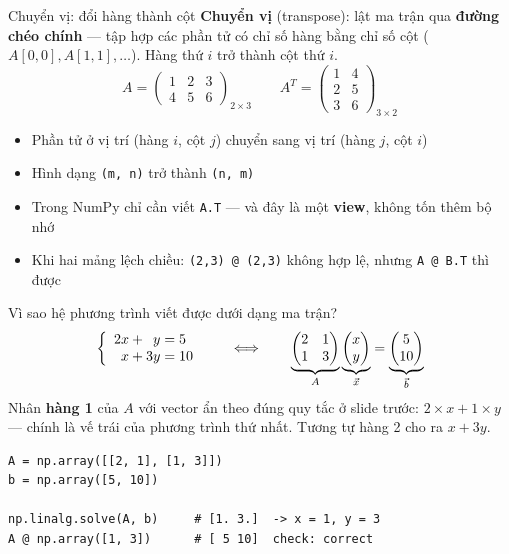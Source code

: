 \documentclass[11pt]{beamer}
\begin{document}
\begin{frame}{Chuyển vị: đổi hàng thành cột}
\textbf{Chuyển vị} (transpose): lật ma trận qua \textbf{đường chéo chính} --- tập hợp các phần tử
có chỉ số hàng bằng chỉ số cột ($A[0,0], A[1,1], \dots$). Hàng thứ $i$ trở thành cột thứ $i$.
\[
  A = \begin{pmatrix} 1 & 2 & 3 \\ 4 & 5 & 6 \end{pmatrix}_{2 \times 3}
  \qquad
  A^{T} = \begin{pmatrix} 1 & 4 \\ 2 & 5 \\ 3 & 6 \end{pmatrix}_{3 \times 2}
\]
\begin{itemize}
  \item Phần tử ở vị trí (hàng $i$, cột $j$) chuyển sang vị trí (hàng $j$, cột $i$)
  \item Hình dạng \texttt{(m, n)} trở thành \texttt{(n, m)}
  \item Trong NumPy chỉ cần viết \texttt{A.T} --- và đây là một \textbf{view}, không tốn thêm bộ nhớ
  \item Khi hai mảng lệch chiều: \texttt{(2,3) @ (2,3)} không hợp lệ, nhưng \texttt{A @ B.T} thì được
\end{itemize}
\end{frame}

\begin{frame}[fragile]{Vì sao hệ phương trình viết được dưới dạng ma trận?}
\[
  \left\{
  \begin{array}{r@{\;}c@{\;}l}
    2x + \phantom{3}y &=& 5 \\
    \phantom{2}x + 3y &=& 10
  \end{array}
  \right.
  \qquad\Longleftrightarrow\qquad
  \underbrace{\begin{pmatrix} 2 & 1 \\ 1 & 3 \end{pmatrix}}_{A}
  \underbrace{\begin{pmatrix} x \\ y \end{pmatrix}}_{\vec{x}}
  =
  \underbrace{\begin{pmatrix} 5 \\ 10 \end{pmatrix}}_{\vec{b}}
\]
Nhân \textbf{hàng 1} của $A$ với vector ẩn theo đúng quy tắc ở slide trước:
$2 {\times} x + 1 {\times} y$ --- chính là vế trái của phương trình thứ nhất.
Tương tự hàng 2 cho ra $x + 3y$.
\begin{lstlisting}
A = np.array([[2, 1], [1, 3]])
b = np.array([5, 10])

np.linalg.solve(A, b)     # [1. 3.]  -> x = 1, y = 3
A @ np.array([1, 3])      # [ 5 10]  check: correct
\end{lstlisting}
\end{frame}
\end{document}
